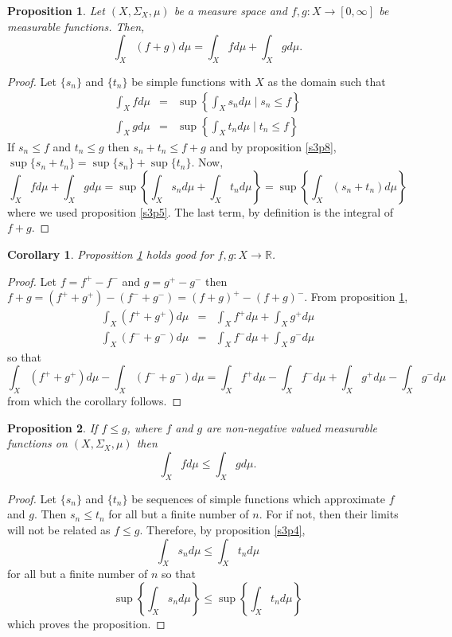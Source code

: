 \documentclass{article}
\newcommand{\sor}{\mathbb{R}}
\theoremstyle{plain}
\numberwithin{thm}{section}
\theoremstyle{plain}
\newtheorem{prop}{Proposition}
\numberwithin{prop}{section}
\theoremstyle{definition}
\numberwithin{defn}{section}
\theoremstyle{remark}
\theoremstyle{plain}
\newtheorem{cor}{Corollary}
\numberwithin{cor}{section}
\numberwithin{equation}{section}
\begin{document}
\begin{prop}\label{s3p9}
Let $(X, \Sigma_X, \mu)$ be a measure space and $f, g:X \rightarrow [0, \infty]$ 
be measurable functions. Then,
\[
\int_X(f + g)d\mu = \int_X f d\mu + \int_X g d\mu.
\]
\end{prop}
\begin{proof}
Let $\{s_n\}$ and $\{t_n\}$ be simple functions with $X$ as the domain such that
\begin{eqnarray*}
\int_X f d\mu &=& \sup\left\{\int_X s_n d\mu \;|\; s_n \le f\right\} \\
\int_X g d\mu &=& \sup\left\{\int_X t_n d\mu \;|\; t_n \le f\right\} 
\end{eqnarray*}
If $s_n \le f$ and $t_n \le g$ then $s_n + t_n \le f + g$ and by proposition
\ref{s3p8}, $\sup\{s_n + t_n\} = \sup\{s_n\} + \sup\{t_n\}$. Now,
\[
\int_X fd\mu + \int_X gd\mu = \sup\left\{\int_X s_n d\mu + \int_X t_nd\mu\right\}
= \sup\left\{\int_X(s_n + t_n)d\mu\right\}
\]
where we used proposition \ref{s3p5}. The last term, by definition is the integral
of $f+g$.
\end{proof}

\begin{cor}\label{s3c1}
Proposition \ref{s3p9} holds good for $f, g: X \rightarrow \sor$.
\end{cor}
\begin{proof}
Let $f = f^+ - f^-$ and $g = g^+ - g^-$ then $f + g = (f^+ + g^+) - (f^- + g^-)
= (f+g)^+ - (f+g)^-$. From proposition \ref{s3p9},
\begin{eqnarray*}
\int_X(f^+ + g^+)d\mu &=& \int_X f^+ d\mu + \int_X g^+d\mu \\
\int_X(f^- + g^-)d\mu &=& \int_X f^- d\mu + \int_X g^-d\mu
\end{eqnarray*}
so that
\[
\int_X(f^+ + g^+)d\mu - \int_X(f^- + g^-)d\mu = \int_X f^+ d\mu - \int_X f^-d\mu
+ \int_X g^+d\mu - \int_X g^-d\mu
\]
from which the corollary follows.
\end{proof}

\begin{prop}\label{s3p10}
If $f \le g$, where $f$ and $g$ are non-negative valued measurable functions on 
$(X, \Sigma_X, \mu)$ then
\[
\int_X fd\mu \le \int_X gd\mu.
\]
\end{prop}
\begin{proof}
Let $\{s_n\}$ and $\{t_n\}$ be sequences of simple functions which approximate
$f$ and $g$. Then $s_n \le t_n$ for all but a finite number of $n$. For if not,
then their limits will not be related as $f \le g$. Therefore, by proposition
\ref{s3p4},
\[
\int_X s_n d\mu \le \int_X t_n d\mu
\]
for all but a finite number of $n$ so that
\[
\sup\left\{\int_X s_n d\mu\right\} \le \sup\left\{\int_X t_n d\mu\right\}
\]
which proves the proposition.
\end{proof}
\end{document}
